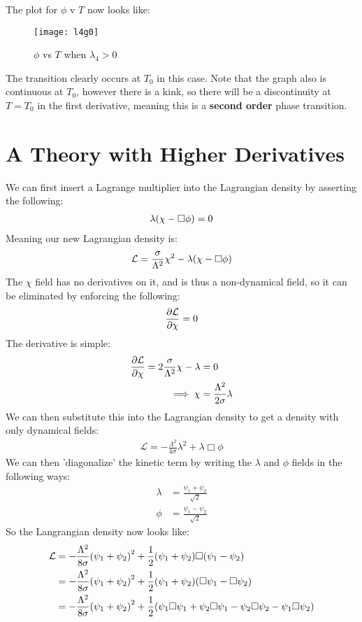 \documentclass[12pt]{article}
\renewcommand{\L}{\mathcal{L}}
\begin{document}
The plot for $\phi$ v $T$ now looks like:
\begin{figure}[H]
  \centering
  \texttt{[image: l4g0]}
  \caption{$\phi$ vs $T$ when $\lambda_4>0$}
\end{figure}
The transition clearly occurs at $T_0$ in this case. Note that the graph also is continuous at $T_0$, however there is a kink, so there will be a discontinuity at $T=T_0$ in the first derivative, meaning this is a \textbf{second order} phase transition.

\section{A Theory with Higher Derivatives}
We can first insert a Lagrange multiplier into the Lagrangian density by asserting the following:
\begin{align*}
  \lambda\qty(\chi-\Box\phi)=0
\end{align*}
Meaning our new Lagrangian density is:
\begin{align*}
  \L=\frac{\sigma}{\Lambda^2}\chi^2-\lambda\qty(\chi-\Box\phi)
\end{align*}
The $\chi$ field has no derivatives on it, and is thus a non-dynamical field, so it can be eliminated by enforcing the following:
\begin{align*}
  \pdv{\L}{\chi}=0
\end{align*}
The derivative is simple:
\begin{align*}
  \pdv{\L}{\chi}=2\frac\sigma{\Lambda^2}\chi-\lambda&=0\\
  \implies\chi&=\frac{\Lambda^2}{2\sigma}\lambda
\end{align*}
We can then substitute this into the Lagrangian density to get a density with only dynamical fields:
\begin{align*}
  \L=-\frac{\Lambda^2}{4\sigma}\lambda^2+\lambda\Box\phi
\end{align*}
We can then 'diagonalize' the kinetic term by writing the $\lambda$ and $\phi$ fields in the following ways:
\begin{align*}
  \lambda&=\frac{\psi_1+\psi_2}{\sqrt{2}}\\
  \phi&=\frac{\psi_1-\psi_2}{\sqrt{2}}
\end{align*}
So the Langrangian density now looks like:
\begin{align*}
  \L&=-\frac{\Lambda^2}{8\sigma}\qty(\psi_1+\psi_2)^2
  +\frac12\qty(\psi_1+\psi_2)\Box\qty(\psi_1-\psi_2)\\
  &=-\frac{\Lambda^2}{8\sigma}\qty(\psi_1+\psi_2)^2
  +\frac12\qty(\psi_1+\psi_2)\qty(\Box\psi_1-\Box\psi_2)\\
  &=-\frac{\Lambda^2}{8\sigma}\qty(\psi_1+\psi_2)^2
  +\frac12
  \qty(\psi_1\Box\psi_1+\psi_2\Box\psi_1-\psi_2\Box\psi_2-\psi_1\Box\psi_2)
\end{align*}
\end{document}
